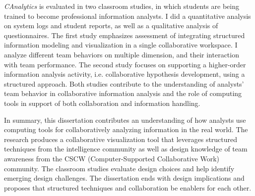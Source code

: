 \textit{CAnalytics} is evaluated in two classroom studies, in which students are being trained to become professional information analysts. I did a quantitative analysis on system logs and student reports, as well as a qualitative analysis of questionnaires. The first study emphasizes assessment of integrating structured information modeling and visualization in a single collaborative workspace. I analyze different team behaviors on multiple dimension, and their interaction with team performance. The second study focuses on supporting a higher-order information analysis activity, i.e. collaborative hypothesis development, using a structured approach. Both studies contribute to the understanding of analysts' team behavior in collaborative information analysis and the role of computing tools in support of both collaboration and information handling.

In summary, this dissertation contributes an understanding of how analysts use computing tools for collaboratively analyzing information in the real world. The research produces a collaborative visualization tool that leverages structured techniques from the intelligence community as well as design knowledge of team awareness from the CSCW (Computer-Supported Collaborative Work) community. The classroom studies evaluate design choices and help identify emerging design challenges. The dissertation ends with design implications and proposes that structured techniques and collaboration be enablers for each other.